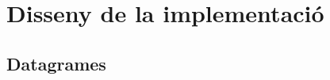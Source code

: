 \documentclass{beamer}
\begin{document}



\section{Disseny de la implementació}
\subsection{Datagrames}
\end{document}
